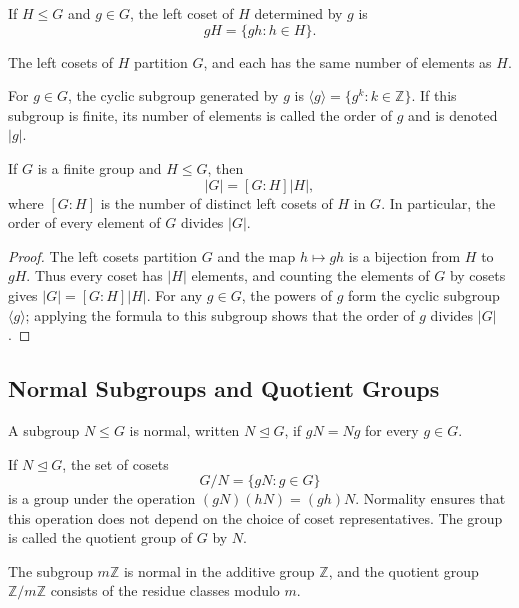 \begin{definition}[Coset]
If $H\leq G$ and $g\in G$, the left coset of $H$ determined by $g$ is
\[
 gH=\{gh:h\in H\}.
\]
\end{definition}

The left cosets of $H$ partition $G$, and each has the same number of elements as $H$.

\begin{definition}
For $g\in G$, the cyclic subgroup generated by $g$ is $\langle g\rangle=\{g^k:k\in\mathbb{Z}\}$. If this subgroup is finite, its number of elements is called the order of $g$ and is denoted $|g|$.
\end{definition}

\begin{theorem}
If $G$ is a finite group and $H\leq G$, then
\[
 |G|=[G:H]|H|,
\]
where $[G:H]$ is the number of distinct left cosets of $H$ in $G$. In particular, the order of every element of $G$ divides $|G|$.
\end{theorem}

\begin{proof}
The left cosets partition $G$ and the map $h\mapsto gh$ is a bijection from $H$ to $gH$. Thus every coset has $|H|$ elements, and counting the elements of $G$ by cosets gives $|G|=[G:H]|H|$. For any $g\in G$, the powers of $g$ form the cyclic subgroup $\langle g\rangle$; applying the formula to this subgroup shows that the order of $g$ divides $|G|$.
\end{proof}

\subsection{Normal Subgroups and Quotient Groups}

\begin{definition}
A subgroup $N\leq G$ is normal, written $N\trianglelefteq G$, if $gN=Ng$ for every $g\in G$.
\end{definition}

\begin{definition}
If $N\trianglelefteq G$, the set of cosets
\[
G/N=\{gN:g\in G\}
\]
is a group under the operation $(gN)(hN)=(gh)N$. Normality ensures that this operation does not depend on the choice of coset representatives. The group is called the quotient group of $G$ by $N$.
\end{definition}

\begin{example}
The subgroup $m\mathbb{Z}$ is normal in the additive group $\mathbb{Z}$, and the quotient group $\mathbb{Z}/m\mathbb{Z}$ consists of the residue classes modulo $m$.
\end{example}

